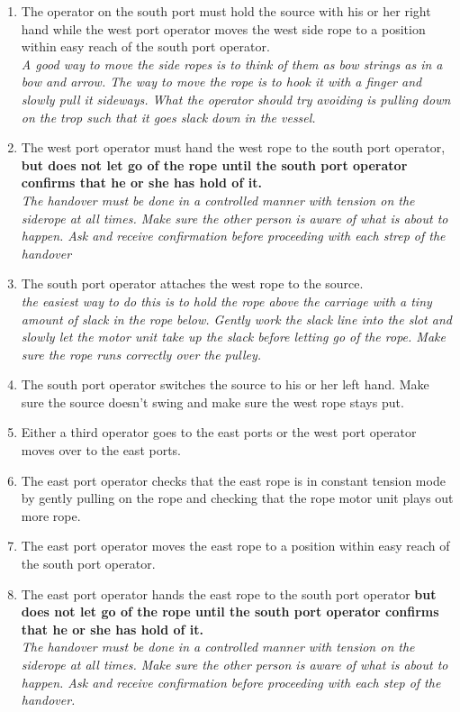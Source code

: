 \documentclass[11pt]{article}
\begin{document}
\begin{enumerate}
\item \CheckBox[name=aesr6]{} The operator on the south port must hold the source with his or her right hand while the west port operator moves the west side rope to a position within easy reach of the south port operator.\\ {\it A good way to move the side ropes is to think of them as bow strings as in a bow and arrow. The way to move the rope is to hook it with a finger and slowly pull it sideways. What the operator should try avoiding is pulling down on the trop such that it goes slack down in the vessel.}
\item \CheckBox[name=aesr7]{} The west port operator must hand the west rope to the south port operator, {\bf but does not let go of the rope until the south port operator confirms that he or she has hold of it.}\\ {\it The handover must be done in a controlled manner with tension on the siderope at all times. Make sure the other person is aware of what is about to happen. Ask and receive confirmation before proceeding with each strep of the handover}
\item \CheckBox[name=aesr8]{} The south port operator attaches the west rope to the source. \\ {\it the easiest way to do this is to hold the rope above the carriage with a tiny amount of slack in the rope below. Gently work the slack line into the slot and slowly let the motor unit take up the slack before letting go of the rope. Make sure the rope runs correctly over the pulley.}
\item \CheckBox[name=aesr9]{} The south port operator switches the source to his or her left hand. Make sure the source doesn't swing and make sure the west rope stays put.
\item \CheckBox[name=aesr10]{} Either a third operator goes to the east ports or the west port operator moves over to the east ports.
\item \CheckBox[name=aesr11]{} The east port operator checks that the east rope is in constant tension mode by gently pulling on the rope and checking that the rope motor unit plays out more rope.
\item \CheckBox[name=aesr12]{} The east port operator moves the east rope to a position within easy reach of the south port operator.
\item \CheckBox[name=aesr13]{} The east port operator hands the east rope to the south port operator {\bf but does not let go of the rope until the south port operator confirms that he or she has hold of it.} \\ {\it The handover must be done in a controlled manner with tension on the siderope at all times. Make sure the other person is aware of what is about to happen. Ask and receive confirmation before proceeding with each step of the handover.}

\end{enumerate}
\end{document}
